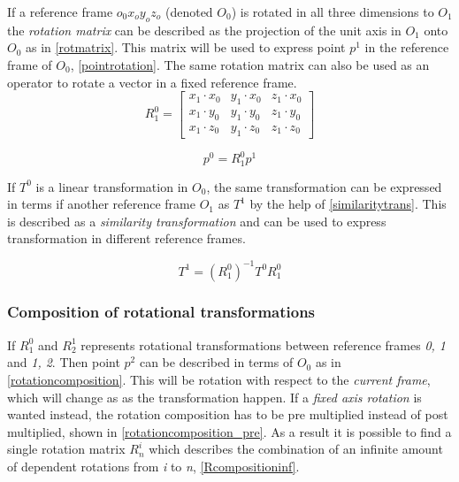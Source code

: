 If a reference frame $o_0 x_o y_o z_o$ (denoted $O_0$) is rotated in all three dimensions to $O_1$ the \textit{rotation matrix} can be described as the projection of the unit axis in $O_1$ onto $O_0$ as in \eqref{rotmatrix}. This matrix will be used to express point $p^1$ in the reference frame of $O_0$, \eqref{pointrotation}. The same rotation matrix can also be used as an operator to rotate a vector in a fixed reference frame.
\begin{equation}\label{rotmatrix}
R^0_1=\begin{bmatrix}
x_1\cdot x_0 & y_1\cdot x_0 & z_1\cdot x_0\\ 
x_1\cdot y_0 & y_1\cdot y_0 & z_1\cdot y_0\\ 
x_1\cdot z_0 & y_1\cdot z_0 & z_1\cdot z_0
\end{bmatrix}
\end{equation}

\begin{equation}\label{pointrotation}
p^0 = R^0_1p^1
\end{equation}

If $T^0$ is a linear transformation in $O_0$, the same transformation can be expressed in terms if another reference frame $O_1$ as $T^1$ by the help of \eqref{similaritytrans}. This is described as a \textit{similarity transformation} and can be used to express transformation in different reference frames.

\begin{equation}\label{similaritytrans}
T^1 = (R^0_1)^{-1}T^0 R^0_1
\end{equation}

\subsubsection{Composition of rotational transformations}

If $R^0_1$ and $R^1_2$ represents rotational transformations between reference frames \textit{0, 1} and \textit{1, 2}. Then point $p^2$ can be described in terms of $O_0$ as in \eqref{rotationcomposition}. This will be rotation with respect to the \textit{current frame}, which will change as as the transformation happen. If a \textit{fixed axis rotation} is wanted instead, the rotation composition has to be pre multiplied instead of post multiplied, shown in \eqref{rotationcomposition_pre}. As a result it is possible to find a single rotation matrix \textit{$R^i_n$} which describes the combination of an infinite amount of dependent rotations from \textit{i} to \textit{n}, \eqref{Rcompositioninf}.


